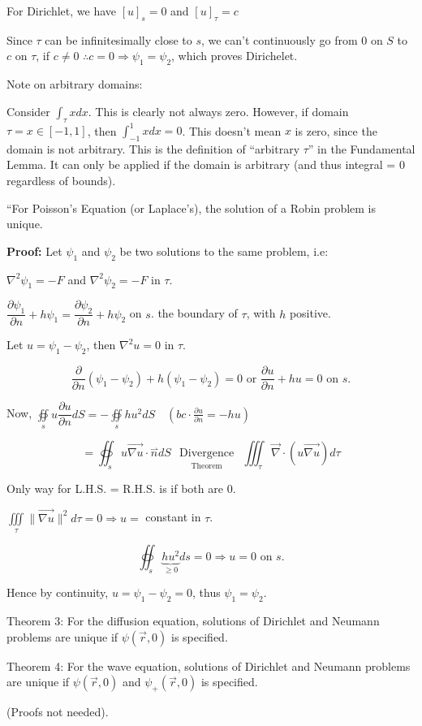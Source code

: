 \documentclass{report}
\begin{document}
For Dirichlet, we have $[u]_{s}=0$ and $[u]_{\tau}=c$

Since $\tau$ can be infinitesimally close to $s$, we can't continuously go from 0 on $S$ to $c$ on $\tau$, if $c \neq 0$ $\therefore c=0 \Rightarrow \psi_{1}=\psi_{2}$, which proves Dirichelet.

Note on arbitrary domains:

Consider $\displaystyle\int_{\tau} x d x$. This is clearly not always zero. However, if domain $\tau=x \in[-1,1]$, then $\displaystyle\int_{-1}^{1} x d x=0$. This doesn't mean $x$ is zero, since the domain is not arbitrary. This is the definition of ``arbitrary $\tau$'' in the Fundamental Lemma. It can only be applied if the domain is arbitrary (and thus integral = 0 regardless of bounds).

``For Poisson's Equation (or Laplace's), the solution of a Robin problem is unique.

\textbf{Proof:} Let $\psi_{1}$ and $\psi_{2}$ be two solutions to the same problem, i.e:

$\nabla^{2} \psi_{1}=-F$ and $\nabla^{2} \psi_{2}=-F$ in $\tau$.

$\dfrac{\partial \psi_{1}}{\partial n}+h \psi_{1}=\dfrac{\partial \psi_{2}}{\partial n}+h \psi_{2}$ on $s$. the boundary of $\tau$, with $h$ positive.

Let $u=\psi_{1}-\psi_{2}$, then $\nabla^{2} u=0$ in $\tau$.

$$
\dfrac{\partial}{\partial n}\left(\psi_{1}-\psi_{2}\right)+h\left(\psi_{1}-\psi_{2}\right)=0 \text { or } \frac{\partial u}{\partial n}+h u=0 \text { on } s .
$$

Now, $\oiint\limits_{s} u \dfrac{\partial u}{\partial n} d S=-\oiint\limits_{s} h u^{2} d S \quad\left(b c \cdot \frac{\partial u}{\partial n}=-h u\right)$

$$
=\oiint_{s} u \overrightarrow{\nabla u} \cdot \stackrel{\rightharpoonup}{n} d S \underset{\text { Theorem }}{\substack{\text { Divergence }}} \iiint_{\tau} \vec{\nabla} \cdot(u \overrightarrow{\nabla u}) d \tau
$$

Only way for L.H.S. = R.H.S. is if both are $0$.

$\iiint\limits_{\tau}\|\overrightarrow{\nabla u}\|^{2} d \tau=0 \Rightarrow u=$ constant in $\tau$.

$$
\oiint_{s} \underbrace{h u^{2}}_{\geqslant 0} d s=0 \Rightarrow u=0 \text { on } s.
$$

Hence by continuity, $u=\psi_{1}-\psi_{2}=0$, thus $\psi_{1}=\psi_{2}$.

Theorem 3: For the diffusion equation, solutions of Dirichlet and Neumann problems are unique if $\psi(\vec{r}, 0)$ is specified.

Theorem 4: For the wave equation, solutions of Dirichlet and Neumann problems are unique if $\psi(\vec{r}, 0)$ and $\psi_{+}(\vec{r}, 0)$ is specified.

(Proofs not needed).
\end{document}
